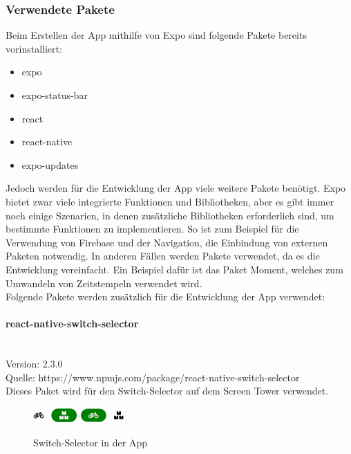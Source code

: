 \subsubsection{Verwendete Pakete}


\bigskip


\noindent Beim Erstellen der App mithilfe von Expo sind folgende Pakete bereits vorinstalliert:
\begin{itemize}
  \item expo
  \item expo-status-bar
  \item react
  \item react-native
  \item expo-updates
\end{itemize}

\noindent Jedoch werden für die Entwicklung der App viele weitere Pakete benötigt. Expo bietet zwar viele integrierte Funktionen und Bibliotheken, aber es gibt immer noch einige Szenarien, in denen zusätzliche Bibliotheken erforderlich sind, um bestimmte Funktionen zu implementieren.
\noindent So ist zum Beispiel für die Verwendung von Firebase und der Navigation, die Einbindung von externen Paketen notwendig.
\noindent In anderen Fällen werden Pakete verwendet, da es die Entwicklung vereinfacht. Ein Beispiel dafür ist das Paket Moment, welches zum Umwandeln von Zeitstempeln verwendet wird.\\
\noindent Folgende Pakete werden zusätzlich für die Entwicklung der App verwendet:


\paragraph{react-native-switch-selector}\mbox{}\\
Version: 2.3.0\\
\noindent Quelle: https://www.npmjs.com/package/react-native-switch-selector\\
Dieses Paket wird für den \Gls{Switch-Selector} auf dem Screen Tower verwendet.
\begin{figure}[H]
  \centering
  \includegraphics[width=0.15\textwidth]{images/app-screenshots/switchselector.png}
  \includegraphics[width=0.15\textwidth]{images/app-screenshots/switchselector2.png}
  \caption{Switch-Selector in der App}
  \label{fig:switchselector}
\end{figure}

